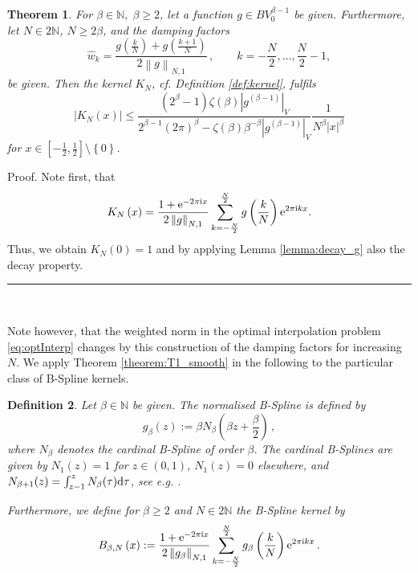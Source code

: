 \documentclass[11pt,a4paper,bibtotoc]{scrartcl}
\def\N{\mathbb{N}}
\def\ti{\mbox{\scriptsize{\rm i}}}
\newcommand{\eip}[1]{{\rm e}^{ 2\pi{\ti} #1}}
\newcommand{\eim}[1]{{\rm e}^{-2\pi{\ti} #1}}
\renewcommand{\d}{{\rm d}}
\renewcommand{\Box}{\hspace*{0ex} \hfill \rule{1.5ex}{1.5ex} \\ \goodbreak}
\newtheorem{theorem}{Theorem}[section]
\newtheorem{definition}[theorem]{Definition}
\newenvironment{Theorem}{\goodbreak \begin{theorem}\sl}{\end{theorem}}
\newenvironment{Definition}{\goodbreak \begin{definition}\rm}{\end{definition}}
\numberwithin{equation}{section}
\numberwithin{table}{section}
\numberwithin{figure}{section}
\begin{document}
\begin{Theorem}
 \label{theorem:T1_smooth}
 For $\beta \in \mathbb{N},\;\beta\ge 2$, let a function $g\in BV^{\beta-1}_0$
 be given.
 Furthermore, let $N\in2\mathbb{N}$, $N\ge 2\beta$, and the 
 damping factors
 \begin{equation*}
   \hat w_k=\frac{g\left(\frac{k}{N}\right)+g\left(\frac{k+1}{N}\right)}{
     2\left\|g\right\|_{N,1}}\,,\qquad k=-\frac{N}{2},\hdots,\frac{N}{2}-1,
 \end{equation*}
 be given.
 Then the kernel $K_N$, cf. Definition \ref{def:kernel},
 fulfils
 \begin{equation*}
   \left| K_N\left(x\right)\right| \le 
   \frac{\left(2^{\beta}-1\right)\zeta\left(\beta\right)
     \left|g^{\left(\beta-1\right)}\right|_V}
   {2^{\beta-1}\left(2\pi\right)^{\beta}- \zeta\left(\beta\right)
     \beta^{-\beta} \left|g^{\left(\beta-1\right)}\right|_V}
   \frac{1}{ N^{\beta}
     |x|^{\beta}}
 \end{equation*}
 for $x\in\left[-\frac{1}{2},\frac{1}{2}\right]\setminus
 \left\{0\right\}$.
\end{Theorem}
Proof. Note first, that
\begin{equation*}
K_N\left(x\right)
= \frac{1+\eim{x}}{2\left\|g\right\|_{N,1}}
\sum\limits_{k=-\frac{N}{2}}^{\frac{N}{2}} g\left(\frac{k}{N}\right) \eip{kx}.
\end{equation*}
Thus, we obtain $K_N(0)=1$ and by applying Lemma \ref{lemma:decay_g} also
the decay property.
\Box

Note however, that the weighted norm in the optimal interpolation problem
\eqref{eq:optInterp} changes by this construction of the damping factors for
increasing $N$.
We apply Theorem \ref{theorem:T1_smooth} in the following to the particular
class of B-Spline kernels.

\begin{Definition}\label{def:spline}
  Let $\beta \in \mathbb{N}$ be given.
  The {\em normalised B-Spline} is defined by
  \begin{equation*}
    g_{\beta}\left(z\right):=\beta N_{\beta}\left(\beta z+
        \frac{\beta}{2}\right)\,,
  \end{equation*}
  where $N_{\beta}$ denotes the cardinal B-Spline of order $\beta$.
  The cardinal B-Splines are given by $N_1(z)=1$ for $z\in(0,1)$,
  $N_1(z)=0$ elsewhere, and $N_{\beta+1}(z)=\int_{z-1}^{z}N_{\beta}(\tau)
  \d\tau$, see e.g. \cite{Chui88}.

  Furthermore, we define for $\beta \ge 2$ and $N\in 2\N$ the {\em B-Spline
  kernel} by
  \begin{equation*}
   B_{\beta,N}\left(x\right)
   :=\frac{1+\eim{x}}{2\left\|g_{\beta}\right\|_{N,1}}
   \sum_{k=-\frac{N}{2}}^{\frac{N}{2}} g_{\beta}\left(\frac{k}{N}\right)
   \eip{kx}\,.
  \end{equation*}
\end{Definition}
\end{document}
